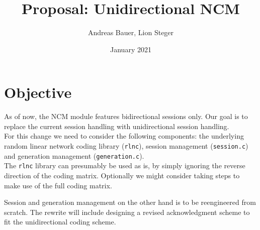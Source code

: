 \documentclass[a4paper, 11pt]{article}
\title{Proposal: Unidirectional NCM}
\author{Andreas Bauer, Lion Steger}
\date{January 2021}
\newcommand{\ilc}[1]{\texttt{#1}} %
\begin{document}
    \maketitle

    \section{Objective}\label{sec:objective}
    As of now, the NCM module features bidirectional sessions only.
    Our goal is to replace the current session handling with unidirectional session handling.
    \\

    For this change we need to consider the following components: the underlying random linear network coding library (\ilc{rlnc}),
    session management (\ilc{session.c}) and generation management (\ilc{generation.c}).
    \\

    The \ilc{rlnc} library can presumably be used as is, by simply ignoring the reverse direction of the coding matrix.
    Optionally we might consider taking steps to make use of the full coding matrix.

    Session and generation management on the other hand is to be reengineered from scratch.
    The rewrite will include designing a revised acknowledgment scheme to fit the unidirectional coding scheme.
\end{document}
